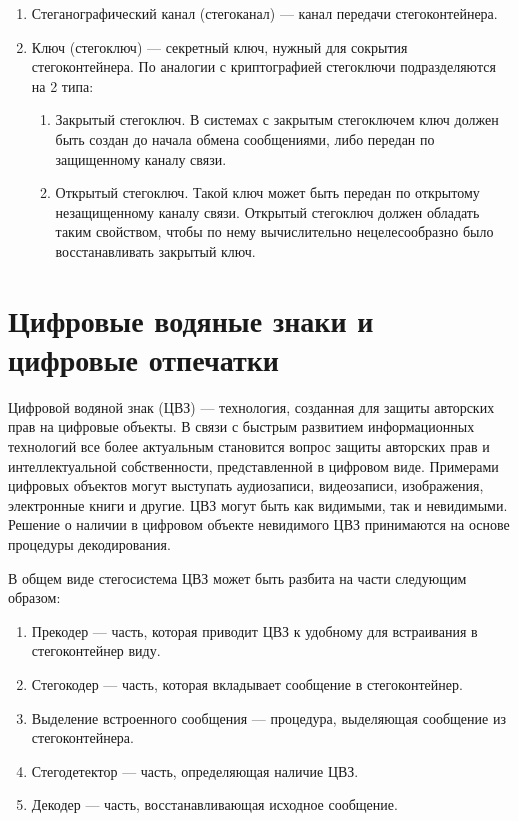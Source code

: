 \begin{enumerate}
\begin{enumerate}
    \end{enumerate}
    \item Стеганографический канал (стегоканал) --- канал передачи стегоконтейнера.
    \item Ключ (стегоключ) --- секретный ключ, нужный для сокрытия стегоконтейнера.
    По аналогии с криптографией стегоключи подразделяются на 2 типа:
    \begin{enumerate}
        \item Закрытый стегоключ.
        В системах с закрытым стегоключем ключ должен быть создан до начала обмена сообщениями,
        либо передан по защищенному каналу связи.
        \item Открытый стегоключ. Такой ключ может быть передан по открытому незащищенному каналу связи.
        Открытый стегоключ должен обладать таким свойством, чтобы по нему вычислительно нецелесообразно
        было восстанавливать закрытый ключ.
    \end{enumerate}
\end{enumerate}

\section{Цифровые водяные знаки и цифровые отпечатки}

Цифровой водяной знак (ЦВЗ) --- технология, созданная для защиты авторских прав на цифровые объекты.
В связи с быстрым развитием информационных технологий все более актуальным становится
вопрос защиты авторских прав и интеллектуальной собственности, представленной в цифровом виде.
Примерами цифровых объектов могут выступать аудиозаписи, видеозаписи, изображения, электронные книги и другие. 
ЦВЗ могут быть как видимыми, так и невидимыми. Решение о наличии в цифровом объекте невидимого ЦВЗ принимаются
на основе процедуры декодирования.

В общем виде стегосистема ЦВЗ может быть разбита на части следующим образом:
\begin{enumerate}
    \item Прекодер --- часть, которая приводит ЦВЗ к удобному для встраивания в стегоконтейнер виду.
    \item Стегокодер --- часть, которая вкладывает сообщение в стегоконтейнер.
    \item Выделение встроенного сообщения --- процедура, выделяющая сообщение из стегоконтейнера.
    \item Стегодетектор --- часть, определяющая наличие ЦВЗ.
    \item Декодер --- часть, восстанавливающая исходное сообщение.
\end{enumerate}

